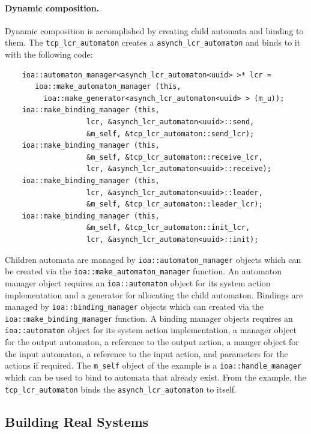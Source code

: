 \paragraph{Dynamic composition.}
Dynamic composition is accomplished by creating child automata and binding to them.
The \verb+tcp_lcr_automaton+ creates a \verb+asynch_lcr_automaton+ and binds to it with the following code:
\begin{lstlisting}
    ioa::automaton_manager<asynch_lcr_automaton<uuid> >* lcr =
       ioa::make_automaton_manager (this,
         ioa::make_generator<asynch_lcr_automaton<uuid> > (m_u));
    ioa::make_binding_manager (this,
			       lcr, &asynch_lcr_automaton<uuid>::send,
			       &m_self, &tcp_lcr_automaton::send_lcr);
    ioa::make_binding_manager (this,
			       &m_self, &tcp_lcr_automaton::receive_lcr,
			       lcr, &asynch_lcr_automaton<uuid>::receive);
    ioa::make_binding_manager (this,
			       lcr, &asynch_lcr_automaton<uuid>::leader,
			       &m_self, &tcp_lcr_automaton::leader_lcr);
    ioa::make_binding_manager (this,
			       &m_self, &tcp_lcr_automaton::init_lcr,
			       lcr, &asynch_lcr_automaton<uuid>::init);
\end{lstlisting}
Children automata are managed by \verb+ioa::automaton_manager+ objects which can be created via the \verb+ioa::make_automaton_manager+ function.
An automaton manager object requires an \verb+ioa::automaton+ object for its system action implementation and a generator for allocating the child automaton.
Bindings are managed by \verb+ioa::binding_manager+ objects which can created via the \verb+ioa::make_binding_manager+ function.
A binding manager objects requires an \verb+ioa::automaton+ object for its system action implementation, a manager object for the output automaton, a reference to the output action, a manger object for the input automaton, a reference to the input action, and parameters for the actions if required.
The \verb+m_self+ object of the example is a \verb+ioa::handle_manager+ which can be used to bind to automata that already exist.
From the example, the \verb+tcp_lcr_automaton+ binds the \verb+asynch_lcr_automaton+ to itself.

\subsection{Building Real Systems}




